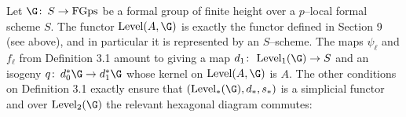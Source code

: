 \begin{example}
Let $\G\co S \to \FGps$ be a formal group of finite height over a $p$--local formal scheme $S$.  The functor $\Level(A, \G)$ is exactly the functor defined in Section 9 (see above), and in particular it is represented by an $S$--scheme.  The maps $\psi_\ell$ and $f_\ell$ from Definition 3.1 amount to giving a map $d_1\co \Level_1(\G) \to S$ and an isogeny $q\co d_0^* \G \to d_1^* \G$ whose kernel on $\Level(A, \G)$ is $A$.  The other conditions on Definition 3.1 exactly ensure that $(\Level_*(\G), d_*, s_*)$ is a simplicial functor and over $\Level_2(\G)$ the relevant hexagonal diagram commutes:
\begin{center}
\end{center}
\end{example}

